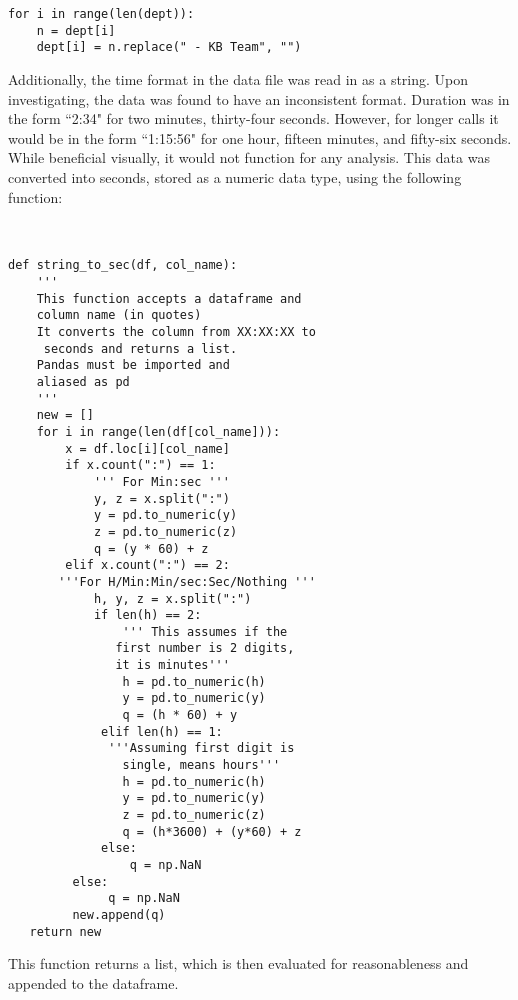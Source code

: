 \documentclass[11pt,twocolumn]{article}
\begin{document}
  \begin{Verbatim}[fontsize=\small]
  for i in range(len(dept)):
    n = dept[i]
    dept[i] = n.replace(" - KB Team", "")
  \end{Verbatim}


Additionally, the time format in the data file was read in as a string.  Upon investigating, the data was found to have an inconsistent format.  Duration was in the form ``2:34" for two minutes, thirty-four seconds.  However, for longer calls it would be in the form ``1:15:56" for one hour, fifteen minutes, and fifty-six seconds.  While beneficial visually, it would not function for any analysis.  This data was converted into seconds, stored as a numeric data type, using the following function:
\\
\\

  \begin{Verbatim}[fontsize=\small]
  
def string_to_sec(df, col_name):
    ''' 
    This function accepts a dataframe and 
    column name (in quotes)
    It converts the column from XX:XX:XX to
     seconds and returns a list.
    Pandas must be imported and 
    aliased as pd
    '''
    new = []
    for i in range(len(df[col_name])):
        x = df.loc[i][col_name]
        if x.count(":") == 1:
            ''' For Min:sec '''
            y, z = x.split(":")
            y = pd.to_numeric(y)
            z = pd.to_numeric(z)
            q = (y * 60) + z
        elif x.count(":") == 2:
       '''For H/Min:Min/sec:Sec/Nothing '''
            h, y, z = x.split(":")
            if len(h) == 2:
                ''' This assumes if the
               first number is 2 digits,
               it is minutes'''
                h = pd.to_numeric(h)
                y = pd.to_numeric(y)
                q = (h * 60) + y
             elif len(h) == 1:
              '''Assuming first digit is 
                single, means hours'''
                h = pd.to_numeric(h)
                y = pd.to_numeric(y)
                z = pd.to_numeric(z)
                q = (h*3600) + (y*60) + z
             else:
                 q = np.NaN
         else:
              q = np.NaN
         new.append(q)
   return new
  \end{Verbatim}

This function returns a list, which is then evaluated for reasonableness and appended to the dataframe.
\end{document}
